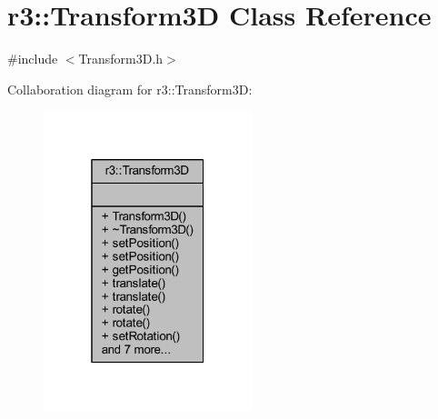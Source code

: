\hypertarget{classr3_1_1_transform3_d}{}\section{r3\+:\+:Transform3D Class Reference}
\label{classr3_1_1_transform3_d}


{\ttfamily \#include $<$Transform3\+D.\+h$>$}



Collaboration diagram for r3\+:\+:Transform3D\+:\nopagebreak
\begin{figure}[H]
\begin{center}
\leavevmode
\includegraphics[width=172pt]{classr3_1_1_transform3_d__coll__graph}
\end{center}
\end{figure}
